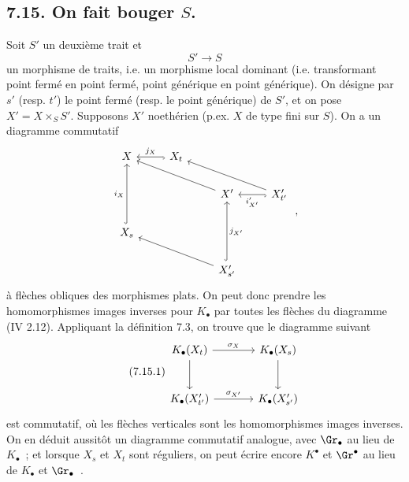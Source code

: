 
\subsection*{7.15. On fait bouger \(S\).}
Soit \(S'\) un deuxième trait et
\[
  S'\longrightarrow S
\]
un morphisme de traits, i.e. un morphisme local dominant (i.e. transformant point fermé en point fermé, point générique en point générique). On désigne par \(s'\) (resp. \(t'\)) le point fermé (resp. le point générique) de \(S'\), et on pose \(X'=X\times_SS'\). Supposons \(X'\) noethérien (p.ex. \(X\) de type fini sur \(S\)). On a un diagramme commutatif
\[
\begin{tikzcd}
X & X_t \arrow[l,hook,"j_X"'] & & \\
& & X' \arrow[ull] & X'_{t'} \arrow[l,hook,"i'_{X'}"] \arrow[ull] \\
X_s \arrow[uu,hook,"i_X"] & & & \\
& & X'_{s'} \arrow[uu,hook,"j_{X'}"'] \arrow[ull] &
\end{tikzcd}
\;,
\]
à flèches obliques des morphismes plats. On peut donc prendre les homomorphismes images inverses pour \(K_\bullet\) par toutes les flèches du diagramme (IV 2.12). Appliquant la définition 7.3, on trouve que le diagramme suivant
\begin{equation}\tag{7.15.1}
\begin{tikzcd}[column sep=large,row sep=large]
K_\bullet(X_t) \arrow[r,"\sigma_X"] \arrow[d] &
K_\bullet(X_s) \arrow[d]\\
K_\bullet(X'_{t'}) \arrow[r,"\sigma_{X'}"] &
K_\bullet(X'_{s'})
\end{tikzcd}
\end{equation}
est commutatif, où les flèches verticales sont les homomorphismes images inverses. On en déduit aussitôt un diagramme commutatif analogue, avec \(\Gr_\bullet\) au lieu de \(K_\bullet\)~; et lorsque \(X_s\) et \(X_t\) sont réguliers, on peut écrire encore \(K^\bullet\) et \(\Gr^\bullet\) au lieu de \(K_\bullet\) et \(\Gr_\bullet\)~.

